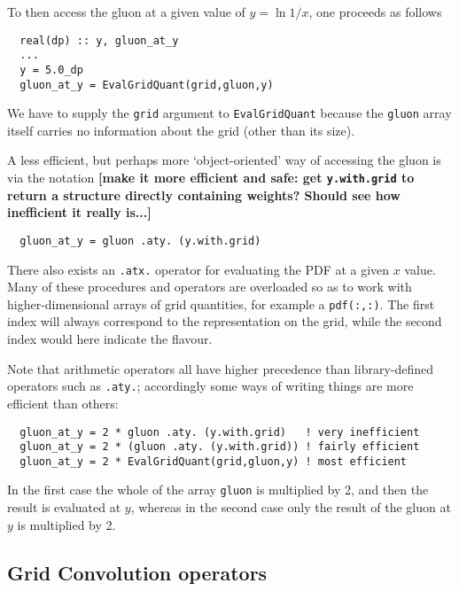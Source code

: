\documentclass[12pt]{article}
\newcommand{\comment}[1]{\textbf{[#1]}}
\newcommand{\ttt}[1]{\texttt{#1}}
\begin{document}
To then access the gluon at a given value of $y = \ln 1/x$, one
proceeds as follows
\begin{verbatim}
  real(dp) :: y, gluon_at_y
  ...
  y = 5.0_dp
  gluon_at_y = EvalGridQuant(grid,gluon,y)
\end{verbatim}
We have to supply the \texttt{grid} argument to \ttt{EvalGridQuant}
because the \ttt{gluon} array itself carries no information about the
grid (other than its size).

A less efficient, but perhaps more `object-oriented' way of accessing
the gluon is via the notation \comment{make it more efficient and
  safe: get \texttt{y.with.grid} to return a structure directly
  containing weights? Should see how inefficient it really is...}
\begin{verbatim}
  gluon_at_y = gluon .aty. (y.with.grid)
\end{verbatim}
There also exists an \ttt{.atx.} operator for evaluating the PDF at a
given $x$ value.  Many of these procedures and operators are
overloaded so as to work with higher-dimensional arrays of grid
quantities, for example a \texttt{pdf(:,:)}. The first index will
always correspond to the representation on the grid, while the second
index would here indicate the flavour.

Note that arithmetic operators all have higher precedence than
library-defined operators such as \texttt{.aty.}; accordingly some
ways of writing things are more efficient than others:
\begin{verbatim}
  gluon_at_y = 2 * gluon .aty. (y.with.grid)   ! very inefficient
  gluon_at_y = 2 * (gluon .aty. (y.with.grid)) ! fairly efficient
  gluon_at_y = 2 * EvalGridQuant(grid,gluon,y) ! most efficient
\end{verbatim}
In the first case the whole of the array \texttt{gluon} is multiplied
by 2, and then the result is evaluated at $y$, whereas in the second
case only the result of the gluon at $y$ is multiplied by 2.

\subsection{Grid Convolution operators}
\label{sec:conv}
\end{document}
